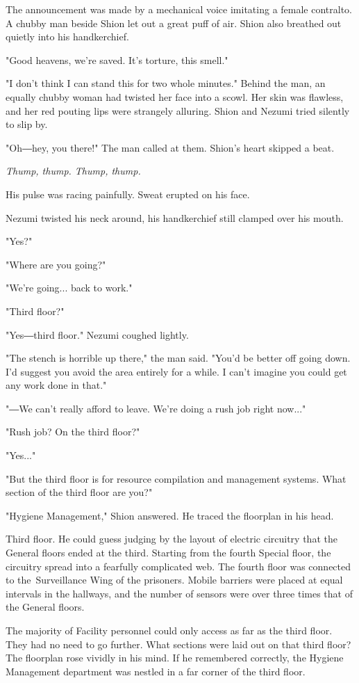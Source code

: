 The announcement was made by a mechanical voice imitating a female
contralto. A chubby man beside Shion let out a great puff of air. Shion
also breathed out quietly into his handkerchief.

"Good heavens, we're saved. It's torture, this smell."

"I don't think I can stand this for two whole minutes." Behind the man,
an equally chubby woman had twisted her face into a scowl. Her skin was
flawless, and her red pouting lips were strangely alluring. Shion and
Nezumi tried silently to slip by.

"Oh―hey, you there!" The man called at them. Shion's heart skipped a
beat.

\emph{Thump, thump. Thump, thump.}

His pulse was racing painfully. Sweat erupted on his face.

Nezumi twisted his neck around, his handkerchief still clamped over his
mouth.

"Yes?"

"Where are you going?"

"We're going... back to work."

"Third floor?"

"Yes―third floor." Nezumi coughed lightly.

"The stench is horrible up there," the man said. "You'd be better off
going down. I'd suggest you avoid the area entirely for a while. I can't
imagine you could get any work done in that."

"―We can't really afford to leave. We're doing a rush job right now..."

"Rush job? On the third floor?"

"Yes..."

"But the third floor is for resource compilation and management systems.
What section of the third floor are you?"

"Hygiene Management," Shion answered. He traced the floorplan in his
head.

Third floor. He could guess judging by the layout of electric circuitry
that the General floors ended at the third. Starting from the fourth
Special floor, the circuitry spread into a fearfully complicated web.
The fourth floor was connected to the~Surveillance Wing of the
prisoners. Mobile barriers were placed at equal intervals in the
hallways, and the number of sensors were over three times that of the
General floors.

The majority of Facility personnel could only access as far as the third
floor. They had no need to go further. What sections were laid out on
that third floor? The floorplan rose vividly in his mind. If he
remembered correctly, the Hygiene Management department was nestled in a
far corner of the third floor.

